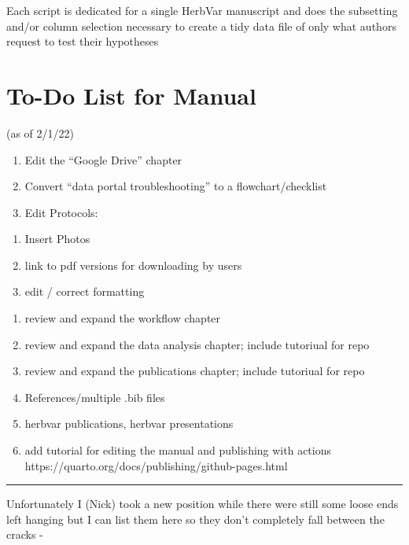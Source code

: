 \documentclass[
  letterpaper,
  DIV=11,
  numbers=noendperiod]{scrreprt}
\providecommand{\tightlist}{%
  \setlength{\itemsep}{0pt}\setlength{\parskip}{0pt}}\usepackage{longtable,booktabs,array}
\begin{document}
Each script is dedicated for a single HerbVar manuscript and does the
subsetting and/or column selection necessary to create a tidy data file
of only what authors request to test their hypotheses

\chapter{To-Do List for Manual}\label{to-do-list-for-manual}

(as of 2/1/22)

\begin{enumerate}
\def\labelenumi{\arabic{enumi}.}
\tightlist
\item
  Edit the ``Google Drive'' chapter
\item
  Convert ``data portal troubleshooting'' to a flowchart/checklist
\item
  Edit Protocols:
\end{enumerate}

\begin{enumerate}
\def\labelenumi{\alph{enumi}.}
\tightlist
\item
  Insert Photos
\item
  link to pdf versions for downloading by users
\item
  edit / correct formatting
\end{enumerate}

\begin{enumerate}
\def\labelenumi{\arabic{enumi}.}
\setcounter{enumi}{3}
\tightlist
\item
  review and expand the workflow chapter
\item
  review and expand the data analysis chapter; include tutoriual for
  repo
\item
  review and expand the publications chapter; include tutoriual for repo
\item
  References/multiple .bib files
\item
  herbvar publications, herbvar presentations
\item
  add tutorial for editing the manual and publishing with actions
  https://quarto.org/docs/publishing/github-pages.html
\end{enumerate}

\begin{center}\rule{0.5\linewidth}{0.5pt}\end{center}

Unfortunately I (Nick) took a new position while there were still some
loose ends left hanging but I can list them here so they don't
completely fall between the cracks -
\end{document}
